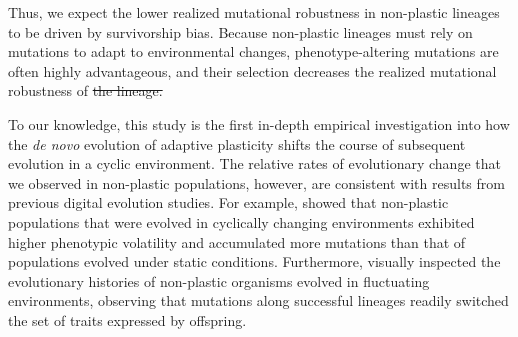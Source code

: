 \documentclass[utf8]{frontiersSCNS} %
\providecommand{\DIFaddtex}[1]{{\protect\color{blue}\uwave{#1}}} %
\providecommand{\DIFdeltex}[1]{{\protect\color{red}\sout{#1}}}                      %
\providecommand{\DIFaddbegin}{} %
\providecommand{\DIFaddend}{} %
\providecommand{\DIFdelbegin}{} %
\providecommand{\DIFdelend}{} %
\providecommand{\DIFadd}[1]{\texorpdfstring{\DIFaddtex{#1}}{#1}} %
\providecommand{\DIFdel}[1]{\texorpdfstring{\DIFdeltex{#1}}{}} %
\newcommand{\DIFscaledelfig}{0.5}
\newlength{\DIFdelgraphicswidth} %
\newlength{\DIFdelgraphicsheight} %
\newcommand{\DIFaddincludegraphics}[2][]{{\color{blue}\fbox{\DIFOincludegraphics[#1]{#2}}}} %
\newcommand{\DIFdelincludegraphics}[2][]{%
\sbox{\DIFdelgraphicsbox}{\DIFOincludegraphics[#1]{#2}}%
\settoboxwidth{\DIFdelgraphicswidth}{\DIFdelgraphicsbox} %
\settoboxtotalheight{\DIFdelgraphicsheight}{\DIFdelgraphicsbox} %
\scalebox{\DIFscaledelfig}{%
\parbox[b]{\DIFdelgraphicswidth}{\usebox{\DIFdelgraphicsbox}\\[-\baselineskip] \rule{\DIFdelgraphicswidth}{0em}}\llap{\resizebox{\DIFdelgraphicswidth}{\DIFdelgraphicsheight}{%
\setlength{\unitlength}{\DIFdelgraphicswidth}%
\begin{picture}(1,1)%
\thicklines\linethickness{2pt} %
{\color[rgb]{1,0,0}\put(0,0){\framebox(1,1){}}}%
{\color[rgb]{1,0,0}\put(0,0){\line( 1,1){1}}}%
{\color[rgb]{1,0,0}\put(0,1){\line(1,-1){1}}}%
\end{picture}%
}\hspace*{3pt}}} %
} %
\DeclareRobustCommand{\DIFaddbegin}{\DIFOaddbegin \let\includegraphics\DIFaddincludegraphics} %
\DeclareRobustCommand{\DIFaddend}{\DIFOaddend \let\includegraphics\DIFOincludegraphics} %
\DeclareRobustCommand{\DIFdelbegin}{\DIFOdelbegin \let\includegraphics\DIFdelincludegraphics} %
\DeclareRobustCommand{\DIFdelend}{\DIFOaddend \let\includegraphics\DIFOincludegraphics} %
\begin{document}
\begin{raggedbottom}
Thus, we expect the lower realized mutational robustness in non-plastic lineages to be driven by survivorship bias.
Because non-plastic lineages must rely on mutations to adapt to environmental changes, phenotype-altering mutations are often highly advantageous, and their selection decreases the realized mutational robustness of \DIFdelbegin \DIFdel{the lineage.
}\DIFdelend \DIFaddbegin \DIFadd{successful lineages.
}\DIFaddend 


To our knowledge, this study is the first in-depth empirical investigation into how the \textit{de novo} evolution of adaptive plasticity shifts the course of subsequent evolution in a cyclic environment.
The relative rates of evolutionary change that we observed in non-plastic populations, however, are consistent with results from previous digital evolution studies.
For example, \cite{dolson_interpreting_2020} showed that non-plastic populations that were evolved in cyclically changing environments exhibited higher phenotypic volatility and accumulated more mutations than that of populations evolved under static conditions.
Furthermore, \cite{lalejini_evolutionary_2016} visually inspected the evolutionary histories of non-plastic organisms evolved in fluctuating environments, observing that mutations along successful lineages readily switched the set of traits expressed by offspring.



\end{raggedbottom}
\end{document}
